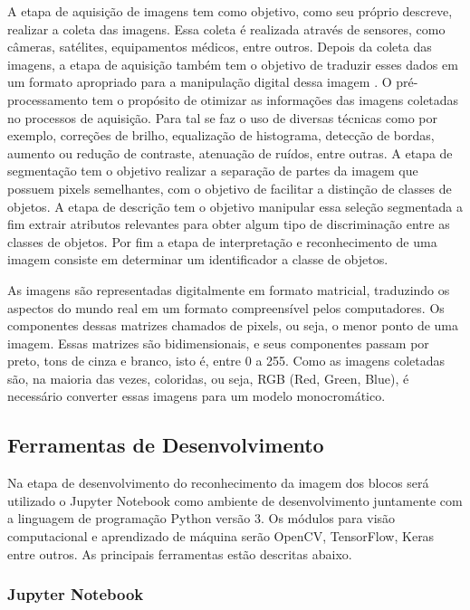 A etapa de aquisição de imagens tem como objetivo, como seu próprio descreve, realizar a coleta das imagens. Essa coleta é realizada através de sensores, como câmeras, satélites, equipamentos médicos, entre outros. Depois da coleta das imagens, a etapa de aquisição também tem o objetivo de traduzir esses dados em um formato apropriado para a manipulação digital dessa imagem \cite{schwartz_2007}. O pré-processamento tem o propósito de otimizar as informações das imagens coletadas no processos de aquisição. Para tal se faz o uso de diversas técnicas como por exemplo, correções de brilho, equalização de histograma, detecção de bordas, aumento ou redução de contraste, atenuação de ruídos, entre outras. 
A etapa de segmentação tem o objetivo realizar a separação de partes da imagem que possuem pixels semelhantes, com o objetivo de facilitar a distinção de classes de objetos.  
A etapa de descrição tem o objetivo manipular essa seleção segmentada a fim extrair atributos relevantes para obter algum tipo de discriminação entre as classes de objetos. 
Por fim a etapa de interpretação e reconhecimento de uma imagem consiste em determinar um identificador a classe de objetos. 



As imagens são representadas digitalmente em formato matricial, traduzindo os aspectos do mundo real em um formato compreensível pelos computadores. Os componentes dessas matrizes chamados de pixels, ou seja, o menor ponto de uma imagem.
Essas matrizes são bidimensionais, e seus componentes passam por preto, tons de cinza e branco, isto é, entre 0 a 255. Como as imagens coletadas são, na maioria das vezes, coloridas, ou seja, RGB (Red, Green, Blue), é necessário converter essas imagens para um modelo monocromático.





\subsection{Ferramentas de Desenvolvimento}	

    Na etapa de desenvolvimento do reconhecimento da imagem dos blocos será utilizado o Jupyter Notebook como ambiente de desenvolvimento juntamente com a linguagem de programação Python versão 3. Os módulos para visão computacional e aprendizado de máquina serão OpenCV, TensorFlow, Keras entre outros. As principais ferramentas estão descritas abaixo.	


    \subsubsection{Jupyter Notebook}	


